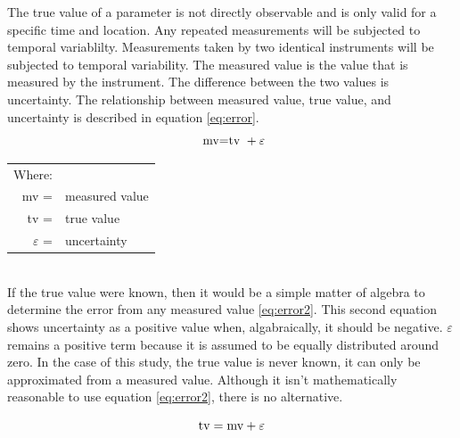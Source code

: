 \begin{linenumbers}
The true value of a parameter is not directly observable and is only valid for a specific time and location.  Any repeated measurements will be subjected to temporal variablilty.  Measurements taken by two identical instruments will be subjected to temporal variability.  The measured value is the value that is measured by the instrument.  The difference between the two values is uncertainty.  The relationship between measured value, true value, and uncertainty is described in equation \ref{eq:error}.
\begin{equation}
\label{eq:error}
\textnormal{ mv=tv } + \varepsilon
\end{equation}
\begin{tabularx}{6in}{r X}
Where:&\\
mv = & measured value\\
tv = & true value\\
$\varepsilon$ = & uncertainty\\
\end{tabularx}\\

If the true value were known, then it would be a simple matter of algebra to determine the error from any measured value \ref{eq:error2}.  This second equation shows uncertainty as a positive value when, algabraically, it should be negative.  $ \varepsilon $ remains a positive term because it is assumed to be equally distributed around zero.  In the case of this study, the true value is never known, it can only be approximated from a measured value.  Although it isn't mathematically reasonable to use equation \ref{eq:error2}, there is no alternative.

\begin{equation}
\label{eq:error2}
\textnormal{tv} = \textnormal{mv} + \varepsilon
\end{equation}


\end{linenumbers}
